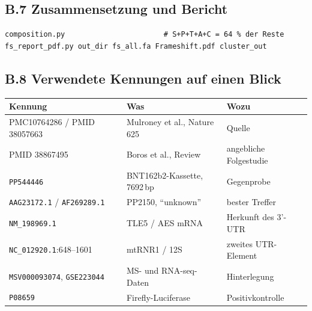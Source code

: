 \documentclass[11pt,a4paper]{article}
\begin{document}
\subsection*{B.7 Zusammensetzung und Bericht}

\begin{lstlisting}
composition.py                       # S+P+T+A+C = 64 % der Reste
fs_report_pdf.py out_dir fs_all.fa Frameshift.pdf cluster_out
\end{lstlisting}

\subsection*{B.8 Verwendete Kennungen auf einen Blick}

\begin{center}
\footnotesize
\begin{tabular}{lll}
\toprule
Kennung & Was & Wozu \\
\midrule
PMC10764286 / PMID 38057663 & Mulroney et al., Nature 625 & Quelle \\
PMID 38867495 & Boros et al., Review & angebliche Folgestudie \\
\texttt{PP544446} & BNT162b2-Kassette, 7692\,bp & Gegenprobe \\
\texttt{AAG23172.1} / \texttt{AF269289.1} & PP2150, ``unknown'' & bester Treffer \\
\texttt{NM\_198969.1} & TLE5 / AES mRNA & Herkunft des 3'-UTR \\
\texttt{NC\_012920.1}:648--1601 & mtRNR1 / 12S & zweites UTR-Element \\
\texttt{MSV000093074}, \texttt{GSE223044} & MS- und RNA-seq-Daten & Hinterlegung \\
\texttt{P08659} & Firefly-Luciferase & Positivkontrolle \\
\bottomrule
\end{tabular}
\end{center}
\end{document}
